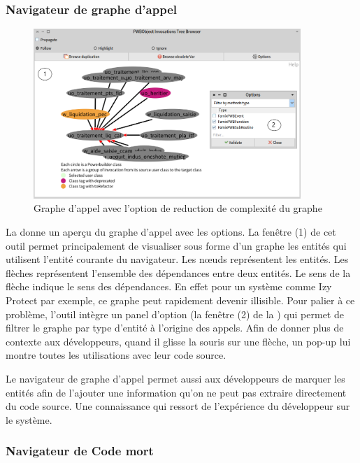 \documentclass[a4paper]{article}
\begin{document}
\subsubsection{Navigateur de graphe d'appel}
\label{sec:callGraphBrowser}
\begin{figure}[htbp]
  \begin{center}
  \includegraphics[width=0.9\textwidth]{./figures/callGraphBrowser.png}
  \caption{Graphe d'appel avec l'option de reduction de complexité du graphe}
  \label{fig:graphAppel}
\end{center}
\vspace{-0.3cm}
\end{figure}
La  donne un aperçu du graphe d'appel avec les options.  
La fenêtre (1) de cet outil permet principalement de visualiser sous forme d'un graphe les entités qui utilisent l'entité courante du navigateur.
Les nœuds représentent les entités. Les flèches représentent l'ensemble des dépendances entre deux entités.
Le sens de la flèche indique le sens des dépendances.
En effet pour un système comme Izy Protect par exemple, ce graphe peut rapidement devenir illisible. 
Pour palier à ce problème, l'outil intègre un panel d'option (la fenêtre (2) de la ) qui permet de filtrer le graphe par type d'entité à l'origine des appels.
Afin de donner plus de contexte aux développeurs, quand il glisse la souris sur une flèche, un pop-up lui montre toutes les utilisations avec leur code source.

Le navigateur de graphe d'appel permet aussi aux développeurs de marquer les entités afin de l'ajouter une information qu'on ne peut pas extraire directement du code source.
Une connaissance qui ressort de l'expérience du développeur sur le système.

\subsubsection{Navigateur de Code mort}
\end{document}

